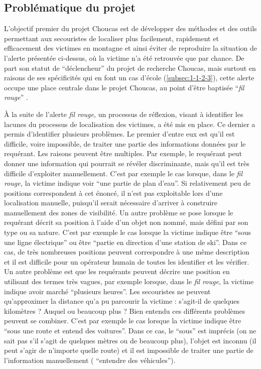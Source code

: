 \subsection{Problématique du projet}
\label{subsec:1-2-2}

L'objectif premier du projet Choucas est de développer des méthodes et
des outils permettant aux secouristes de localiser plus facilement,
rapidement et efficacement des victimes en montagne et ainsi éviter de
reproduire la situation de l'alerte présentée ci-dessus, où la victime
n'a été retrouvée que par chance. De part son statut de
\enquote{déclencheur} du projet de recherche Choucas, mais surtout en
raisons de ses spécificités qui en font un cas d'école
(\autoref{subsec:1-1-2-3}), cette alerte occupe une place centrale
dans le projet Choucas, au point d'être baptisée \enquote{\emph{fil
    rouge}} \autocite{OlteanuRaimond2017}.

À la suite de l'alerte \emph{fil rouge,} un processus de réflexion,
visant à identifier les lacunes du processus de localisation des
victimes, a été mis en place. Ce dernier a permis d'identifier
plusieurs problèmes. Le premier d'entre eux est qu'il est difficile,
voire impossible, de traiter une partie des informations données par
le requérant. Les raisons peuvent être multiples. Par exemple, le
requérant peut donner une information qui pourrait se révéler
discriminante, mais qu'il est très difficile d'exploiter
manuellement. C'est par exemple le cas lorsque, dans le \emph{fil
  rouge,} la victime indique voir \enquote{une partie de plan
  d'eau}. Si relativement peu de positions correspondent à cet énoncé,
il n'est pas exploitable lors d'une localisation manuelle, puisqu'il
serait nécessaire d'arriver à construire manuellement des zones de
visibilité. Un autre problème se pose lorsque le requérant décrit sa
position à l'aide d'un objet non nommé, mais défini par son type ou sa
nature. C'est par exemple le cas lorsque la victime indique être
\enquote{sous une ligne électrique} ou être \enquote{partie \textelp{}
  en direction d'une station de ski}. Dans ce cas, de très nombreuses
positions peuvent correspondre à une même description et il est
difficile pour un opérateur humain de toutes les identifier et les
vérifier. Un autre problème est que les requérants peuvent décrire une
position en utilisant des termes très vagues, par exemple lorsque,
dans le \emph{fil rouge,} la victime indique avoir marché
\enquote{plusieurs heures}. Les secouristes ne peuvent qu'approximer
la distance qu'a pu parcourir la victime : s'agit-il de quelques
kilomètres ? Auquel ou beaucoup plus ? Bien entendu ces différents
problèmes peuvent se combiner. C'est par exemple le cas lorsque la
victime indique être \enquote{sous une route et entend des
  voitures}. Dans ce cas, le \enquote{sous} est imprécis (\ie on ne
sait pas s'il s'agit de quelques mètres ou de beaucoup plus), l'objet
est inconnu (\ie il peut s'agir de n'importe quelle route) et il est
impossible de traiter une partie de l'information manuellement (\ie
\enquote{entendre des véhicules}).

